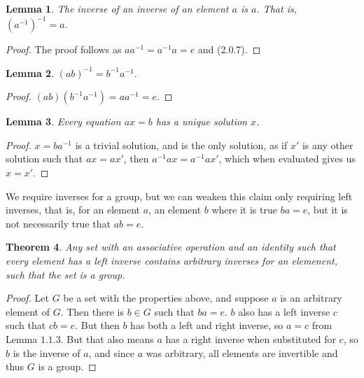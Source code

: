 \documentclass[12pt]{report}
\newtheorem{theorem}{Theorem}[section]
\newtheorem{lemma}[theorem]{Lemma}
\begin{document}
\begin{lemma} The inverse of an inverse of an element $a$ is $a$. That is, $(a^{-1})^{-1} = a$. \end{lemma}
\begin{proof}
    The proof follows as $a a^{-1} = a^{-1} a = e$ and (2.0.7).
\end{proof}

\begin{lemma} $(ab)^{-1} = b^{-1}a^{-1}$. \end{lemma}
\begin{proof} $(ab)(b^{-1}a^{-1}) = aa^{-1} = e$. \end{proof}

\begin{lemma} Every equation $ax = b$ has a unique solution $x$. \end{lemma}
\begin{proof} $x = ba^{-1}$ is a trivial solution, and is the only solution, as if $x'$ is any other solution such that $ax = ax'$, then $a^{-1}ax = a^{-1}ax'$, which when evaluated gives us $x = x'$.
\end{proof}

We require inverses for a group, but we can weaken this claim only requiring left inverses, that is, for an element $a$, an element $b$ where it is true $ba = e$, but it is not necessarily true that $ab = e$.

\begin{theorem}
    Any set with an associative operation and an identity such that every element has a left inverse contains arbitrary inverses for an elemenent, such that the set is a group.
\end{theorem}
\begin{proof}
    Let $G$ be a set with the properties above, and suppose $a$ is an arbitrary element of $G$. Then there is $b \in G$ such that $ba = e$. $b$ also has a left inverse $c$ such that $cb = e$. But then $b$ has both a left and right inverse, so $a = c$ from Lemma $1.1.3$. But that also means $a$ has a right inverse when substituted for $c$, so $b$ is the inverse of $a$, and since $a$ was arbitrary, all elements are invertible and thus $G$ is a group.
\end{proof}
\end{document}

